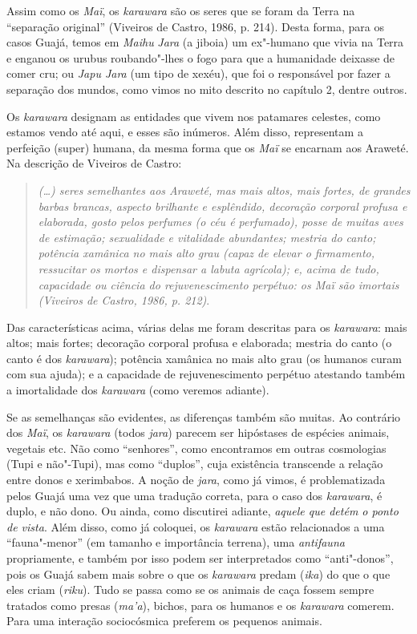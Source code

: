 Assim como os \emph{Maï}, os \emph{karawara} são os seres que se foram
da Terra na ``separação original'' (Viveiros de Castro, 1986, p. 214).
Desta forma, para os casos Guajá, temos em \emph{Maihu} \emph{Jara} (a
jiboia) um ex"-humano que vivia na Terra e enganou os urubus
roubando"-lhes o fogo para que a humanidade deixasse de comer cru; 
ou \emph{Japu Jara} (um tipo de xexéu), que foi o
responsável por fazer a separação dos mundos, como vimos no mito
descrito no capítulo 2, dentre outros.

Os \emph{karawara} designam as entidades que vivem nos patamares
celestes, como estamos vendo até aqui, e esses são inúmeros. Além disso,
representam a perfeição (super) humana, da mesma forma que os \emph{Maï}
se encarnam aos Araweté. Na descrição de Viveiros de Castro:

\begin{quote}
\emph{(\ldots) seres semelhantes aos Araweté, mas mais altos, mais fortes, de
grandes barbas brancas, aspecto brilhante e esplêndido, decoração
corporal profusa e elaborada, gosto pelos perfumes (o céu é perfumado),
posse de muitas aves de estimação; sexualidade e vitalidade abundantes;
mestria do canto; potência xamânica no mais alto grau (capaz de elevar o
firmamento, ressucitar os mortos e dispensar a labuta agrícola); e,
acima de tudo, capacidade ou ciência do rejuvenescimento perpétuo: os
\emph{Maï} são imortais (Viveiros de Castro, 1986, p. 212)}.
\end{quote}

Das características acima, várias delas me foram descritas para os
\emph{karawara}: mais altos; mais fortes; decoração corporal profusa e
elaborada; mestria do canto (o canto é dos \emph{karawara}); potência
xamânica no mais alto grau (os humanos curam com sua ajuda); e a
capacidade de rejuvenescimento perpétuo atestando também a imortalidade
dos \emph{karawara} (como veremos adiante).

Se as semelhanças são evidentes, as diferenças também são muitas. Ao
contrário dos \emph{Maï}, os \emph{karawara} (todos \emph{jara}) parecem
ser hipóstases de espécies animais, vegetais etc. Não como ``senhores'',
como encontramos em outras cosmologias (Tupi e não"-Tupi), mas como
``duplos'', cuja existência transcende a relação entre donos e xerimbabos.
A noção de \emph{jara}, como já vimos, é problematizada pelos Guajá uma
vez que uma tradução correta, para o caso dos \emph{karawara}, é duplo,
e não dono. Ou ainda, como discutirei adiante, \emph{aquele que detém o
ponto de vista}. Além disso, como já coloquei, os \emph{karawara} estão
relacionados a uma ``fauna"-menor'' (em tamanho e importância terrena), uma
\emph{antifauna} propriamente, e também por isso podem ser interpretados
como ``anti"-donos'', pois os Guajá sabem mais sobre o que os
\emph{karawara} predam (\emph{ika}) do que o que eles criam
(\emph{riku}). Tudo se passa como se os animais de caça fossem sempre
tratados como presas (\emph{ma'a}), bichos, para os humanos e os
\emph{karawara} comerem. Para uma interação sociocósmica preferem os
pequenos animais.


